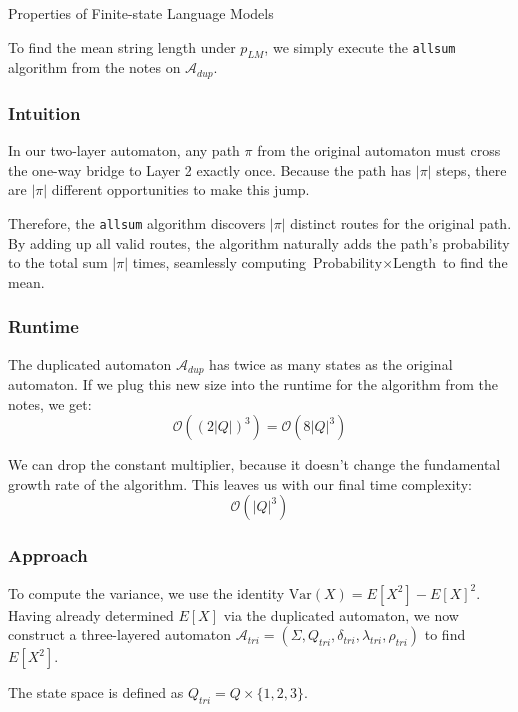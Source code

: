 \begin{question}{Properties of Finite-state Language Models}
\begin{subquestion}
\begin{description}
\end{description}

To find the mean string length under $p_{LM}$, we simply execute the \texttt{allsum} algorithm from the notes on $\mathcal{A}_{dup}$.

\subsubsection*{Intuition}

In our two-layer automaton, any path $\pi$ from the original automaton must cross the one-way bridge to Layer 2 exactly once. Because the path has $|\pi|$ steps, there are $|\pi|$ different opportunities to make this jump. 

Therefore, the \texttt{allsum} algorithm discovers $|\pi|$ distinct routes for the original path. By adding up all valid routes, the algorithm naturally adds the path's probability to the total sum $|\pi|$ times, seamlessly computing $\text{Probability} \times \text{Length}$ to find the mean.

\subsubsection*{Runtime}

The duplicated automaton $\mathcal{A}_{dup}$ has twice as many states as the original automaton. If we plug this new size into the runtime for the algorithm from the notes, we get:
$$ \mathcal{O}((2|Q|)^3) = \mathcal{O}(8|Q|^3) $$

We can drop the constant multiplier, because it doesn't change the fundamental growth rate of the algorithm. This leaves us with our final time complexity:
$$ \mathcal{O}(|Q|^3) $$

\end{subquestion}

\begin{subquestion}

\subsubsection*{Approach}

To compute the variance, we use the identity $\text{Var}(X) = E[X^2] - E[X]^2$. Having already determined $E[X]$ via the duplicated automaton, we now construct a three-layered automaton $\mathcal{A}_{tri} = (\Sigma, Q_{tri}, \delta_{tri}, \lambda_{tri}, \rho_{tri})$ to find $E[X^2]$.

The state space is defined as $Q_{tri} = Q \times \{1, 2, 3\}$.


\end{subquestion}
\end{question}
